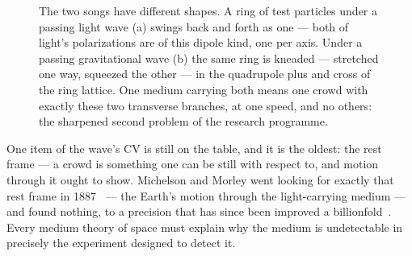 \documentclass[fontsize=11pt,paper=a4,pagesize=auto,parskip=half-]{scrbook}
\newcommand{\Iy}[1]{#1\index{#1}}
\begin{document}
\begin{figure}[htbp]
\centering
{}
\caption{The two songs have different shapes. A ring of test particles under a passing light wave (a) swings back and forth as one --- both of light's polarizations are of this dipole kind, one per axis. Under a passing gravitational wave (b) the same ring is kneaded --- stretched one way, squeezed the other --- in the quadrupole plus and cross of the ring lattice. One medium carrying both means one crowd with exactly these two transverse branches, at one speed, and no others: the sharpened second problem of the research programme.}
\label{fig:dipolequadrupole}
\end{figure}


One item of the wave's CV is still on the table, and it is the oldest: the rest frame --- a crowd is something one can be still with respect to, and motion through it ought to show. \Iy{Michelson} and \Iy{Morley} went looking for exactly that rest frame in 1887~\cite{michelsonmorley1887} --- the Earth's motion through the light-carrying medium --- and found nothing, to a precision that has since been improved a billionfold~\cite{herrmann2009}. Every medium theory of space must explain why the medium is undetectable in precisely the experiment designed to detect it.
\end{document}
